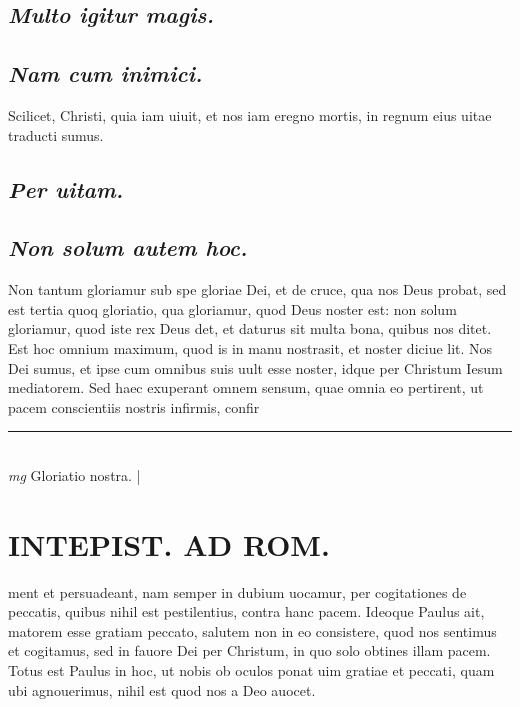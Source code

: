 \documentclass{article}
\begin{document}
\begin{pages}
\subsection*{\textit{Multo igitur magis. }}
{}
\subsection*{\textit{Nam cum inimici. }}\pstart Scilicet, Christi, quia iam uiuit, et nos iam eregno mortis, in regnum eius uitae traducti sumus.   \pend
{}
{}
\subsection*{\textit{Per uitam. }}
{}
\subsection*{\textit{Non solum autem hoc. }}\pstart Non tantum gloriamur sub spe gloriae Dei, et de cruce, qua nos Deus probat, sed est tertia quoq gloriatio, qua gloriamur, quod Deus noster est: non solum gloriamur, quod iste rex Deus det, et daturus sit multa bona, quibus nos ditet. Est hoc omnium maximum, quod is in manu nostrasit, et noster diciue lit. Nos Dei sumus, et ipse cum omnibus suis uult esse noster, idque per Christum Iesum mediatorem. Sed haec exuperant omnem sensum, quae omnia eo pertirent, ut pacem conscientiis nostris infirmis, confir\pend
\vspace{0.5cm}\noindent
\vspace{0.2cm}\rule{1cm}{0.2pt}\\ 
\hspace{0.2cm}\textit{mg}
\footnotesize Gloriatio nostra.  
\normalsize| 
\section*{INTEPIST. AD ROM.  }
\marginpar{[ p.52 ]}\pstart ment et persuadeant, nam semper in dubium uocamur, per cogitationes de peccatis, quibus nihil est pestilentius, contra hanc pacem. Ideoque Paulus ait, matorem esse gratiam peccato, salutem non in eo consistere, quod nos sentimus et cogitamus, sed in fauore Dei per Christum, in quo solo obtines illam pacem.  Totus est Paulus in hoc, ut nobis ob oculos ponat uim gratiae et peccati, quam ubi agnouerimus, nihil est quod nos a Deo auocet.   \pend
{}
{}

\end{pages}
\end{document}
